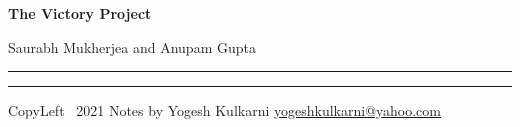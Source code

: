 
\usepackage{beamerarticle} %



\begin{center}
     \Large{\textbf{The Victory Project}}  %
		 
		 \small{Saurabh Mukherjea and Anupam Gupta} 

\end{center}
\rule{\linewidth}{0.25pt}
\raggedright
\footnotesize
\begin{multicols}{3}




\rule{0.3\linewidth}{0.25pt}

\scriptsize
CopyLeft \textcopyleft\ 2021 Notes by Yogesh Kulkarni
\href{http://www.yogeshkulkarni.com}{yogeshkulkarni@yahoo.com}

\end{multicols}

